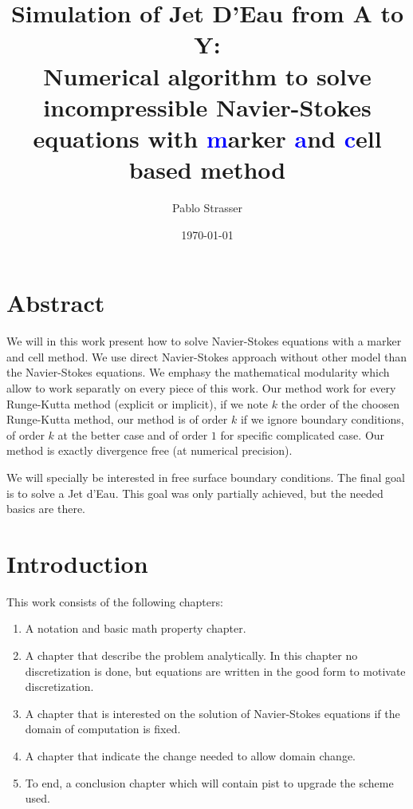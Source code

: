 \documentclass[a4paper]{master}
\title{Simulation of Jet D'Eau from A to Y:\\ Numerical algorithm to solve incompressible Navier-Stokes equations
with \textcolor{blue}{m}arker \textcolor{blue}{a}nd \textcolor{blue}{c}ell based method}
\author{Pablo Strasser}
\date{\today}
\begin{document}
\captionsetup{singlelinecheck=off,margin=10pt,font=small,labelfont=bf}
\maketitle
\dominitoc

\chapter*{Abstract}

\mtcaddchapter[Abstract]

We will in this work present how to solve Navier-Stokes equations with a marker and cell method.
We use direct Navier-Stokes approach without other model than the Navier-Stokes equations.
We emphasy the mathematical modularity which allow to work separatly on every piece of this work.
Our method work for every Runge-Kutta method (explicit or implicit), if we note $k$ the order of the choosen Runge-Kutta method,
our method is of order $k$ if we ignore boundary conditions, of order $k$ at the better case and of order $1$ for specific complicated case.
Our method is exactly divergence free (at numerical precision).

We will specially be interested in free surface boundary conditions. The final goal is to solve a Jet d'Eau.
This goal was only partially achieved, but the needed basics are there. 


\tableofcontents

\chapter*{Introduction}

\mtcaddchapter[Introduction]

This work consists of the following chapters:
\begin{enumerate}
 \item A notation and basic math property chapter.
 \item A chapter that describe the problem analytically. In this chapter no discretization is done, but equations are written in the good form to motivate discretization.
 \item A chapter that is interested on the solution of Navier-Stokes equations if the domain of computation is fixed.
 \item A chapter that indicate the change needed to allow domain change.
 \item To end, a conclusion chapter which will contain pist to upgrade the scheme used.
\end{enumerate}
\end{document}
